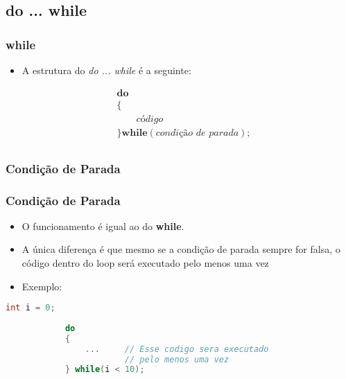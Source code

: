 \subsection{do ... while}

\begin{frame}
    \frametitle{while}
    
        \begin{itemize}
            \item A estrutura do \textit{do ... while} é a seguinte:
        \end{itemize}
    
        \begin{equation*}
            \begin{aligned}
                & \bm{do} \\
                & \{ \\
                & \qquad \textit{código} \\
                & \} \bm{while}( \textit{condição de parada} ); \\
            \end{aligned}
          \end{equation*}
    
\end{frame}




\subsubsection{Condição de Parada}

\begin{frame}[fragile]
    \frametitle{Condição de Parada}
    
        \begin{itemize}
            
            \item O funcionamento é igual ao do \textbf{while}.

            \item A única diferença é que mesmo se a condição de parada sempre for falsa, o código dentro do loop será executado pelo menos uma vez
    
            \item Exemplo:
    
        \end{itemize}
    
        \begin{lstlisting}[language=C]
            int i = 0;
    
            do
            {
                ...     // Esse codigo sera executado 
                        // pelo menos uma vez
            } while(i < 10);
        \end{lstlisting}
    
\end{frame}




